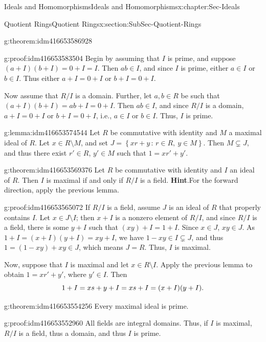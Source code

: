 \documentclass[oneside,10pt,]{book}
\renewcommand{\qedhere}{\relax}
\numberwithin{equation}{section}
\newcommand{\setof}[2]{{\left\{#1\,\colon\,#2\right\}}}
\begin{document}
\begin{chapterptx}{Ideals and Homomorphisms}{}{Ideals and Homomorphisms}{}{}{x:chapter:Sec-Ideals}
\begin{sectionptx}{Quotient Rings}{}{Quotient Rings}{}{}{x:section:SubSec-Quotient-Rings}
\begin{theorem}{}{}{g:theorem:idm416653586928}
\end{theorem}
\begin{proofptx}{}{g:proof:idm416653583504}
Begin by assuming that \(I\) is prime, and suppose \((a+I)(b+I) = 0+I = I\). Then \(ab \in I\), and since \(I\) is prime, either \(a\in I\) or \(b\in I\). Thus either \(a+I = 0+I\) or \(b+I = 0+I\).%
\par
Now assume that \(R/I\) is a domain. Further, let \(a,b\in R\) be such that \((a+I)(b+I) = ab+I = 0+I\). Then \(ab\in I\), and since \(R/I\) is a domain, \(a+I = 0+I\) or \(b+I = 0+I\), i.e., \(a\in I\) or \(b\in I\). Thus, \(I\) is prime.%
\end{proofptx}
\begin{lemma}{}{}{g:lemma:idm416653574544}%
Let \(R\) be commutative with identity and \(M\) a maximal ideal of \(R\). Let \(x\in R\setminus M\), and set \(J = \setof{xr+y}{r\in R, \ y\in M}\). Then \(M\subsetneq J\), and thus there exist \(r'\in R\), \(y'\in M\) such that \(1 = xr'+y'\).%
\end{lemma}
\begin{theorem}{}{}{g:theorem:idm416653569376}%
Let \(R\) be commutative with identity and \(I\) an ideal of \(R\). Then \(I\) is maximal if and only if \(R/I\) is a field.%
\textbf{Hint}.\quad{}For the forward direction, apply the previous lemma.%
\end{theorem}
\begin{proofptx}{}{g:proof:idm416653565072}
If \(R/I\) is a field, assume \(J\) is an ideal of \(R\) that properly contains \(I\). Let \(x\in J\setminus I\); then \(x+I\) is a nonzero element of \(R/I\), and since \(R/I\) is a field, there is some \(y+I\) such that \((xy)+I = 1+I\). Since \(x\in J\), \(xy\in J\). As \(1+I = (x+I)(y+I) = xy+I\), we have \(1-xy\in I\subsetneq J\), and thus \(1 = (1-xy)+xy \in J\), which means \(J = R\). Thus, \(I\) is maximal.%
\par
Now, suppose that \(I\) is maximal and let \(x\in R\setminus I\). Apply the previous lemma to obtain \(1 = xr' + y'\), where \(y'\in I\). Then%
\begin{equation*}
1 + I = xs+y + I = xs + I = (x+I)(y+I)\text{.}\qedhere
\end{equation*}
%
\end{proofptx}
\begin{theorem}{}{}{g:theorem:idm416653554256}%
Every maximal ideal is prime.%
\end{theorem}
\begin{proofptx}{}{g:proof:idm416653552960}
All fields are integral domains. Thus, if \(I\) is maximal, \(R/I\) is a field, thus a domain, and thus \(I\) is prime.%

\end{proofptx}
\end{sectionptx}
\end{chapterptx}
\end{document}
